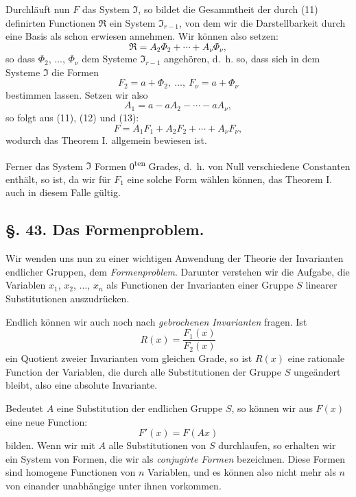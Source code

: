 \documentclass[12pt,a4paper]{article}
\theoremstyle{plain}
\theoremstyle{definition}
\theoremstyle{remark}
\begin{document}
Durchläuft nun $F$ das System $\mathfrak{I}$, so bildet die Gesammtheit der durch (11) definirten Functionen $\mathfrak{R}$ ein System $\mathfrak{I}_{r-1}$, von dem wir die Darstellbarkeit durch eine Basis als schon erwiesen annehmen. Wir können also setzen:
\begin{equation}
\mathfrak{R} = A_{2}\Phi_{2} + \cdots + A_{\nu}\Phi_{\nu},
\end{equation}
so dass $\Phi_{2}$, $\ldots$, $\Phi_{\nu}$ dem Systeme $\mathfrak{I}_{r-1}$ angehören, d.~h. so, dass sich in dem Systeme $\mathfrak{I}$ die Formen
\begin{equation}
F_{2} = a + \Phi_{2},\ \ldots,\ F_{\nu} = a + \Phi_{\nu}
\end{equation}
bestimmen lassen. Setzen wir also
\begin{equation}
A_{1} = a - aA_{2} - \cdots - aA_{\nu},
\end{equation}
so folgt aus (11), (12) und (13):
\begin{equation}
F = A_{1}F_{1} + A_{2}F_{2} + \cdots + A_{\nu}F_{\nu},
\end{equation}
wodurch das Theorem I. allgemein bewiesen ist.

Ferner das System $\mathfrak{I}$ Formen 0\textsuperscript{ten} Grades, d.~h. von Null verschiedene Constanten enthält, so ist, da wir für $F_{1}$ eine solche Form wählen können, das Theorem I. auch in diesem Falle gültig.


\subsection*{\S. 43. Das Formenproblem.}

Wir wenden uns nun zu einer wichtigen Anwendung der Theorie der Invarianten endlicher Gruppen, dem \emph{Formenproblem}. Darunter verstehen wir die Aufgabe, die Variablen $x_{1}$, $x_{2}$, $\ldots$, $x_{n}$ als Functionen der Invarianten einer Gruppe $S$ linearer Substitutionen auszudrücken.

Endlich können wir auch noch nach \emph{gebrochenen Invarianten} fragen. Ist
\[
R(x) = \frac{F_{1}(x)}{F_{2}(x)}
\]
ein Quotient zweier Invarianten vom gleichen Grade, so ist $R(x)$ eine rationale Function der Variablen, die durch alle Substitutionen der Gruppe $S$ ungeändert bleibt, also eine absolute Invariante.

Bedeutet $A$ eine Substitution der endlichen Gruppe $S$, so können wir aus $F(x)$ eine neue Function:
\[
F'(x) = F(Ax)
\]
bilden. Wenn wir mit $A$ alle Substitutionen von $S$ durchlaufen, so erhalten wir ein System von Formen, die wir als \emph{conjugirte Formen} bezeichnen. Diese Formen sind homogene Functionen von $n$ Variablen, und es können also nicht mehr als $n$ von einander unabhängige unter ihnen vorkommen.
\end{document}
